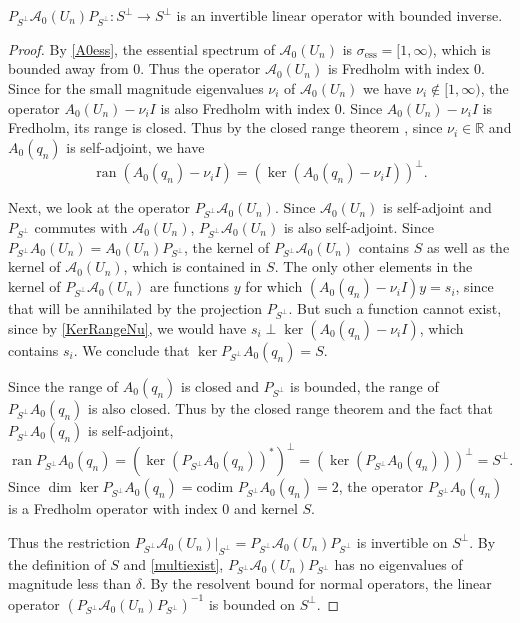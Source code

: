 \documentclass[review,onefignum,onetabnum]{siamart171218}
\newcommand{\R}{\mathbb{R}}
\def\dim{\mathop\mathrm{dim}\nolimits}
\def\ker{\mathop\mathrm{ker}\nolimits}
\def\Ran{\mathop\mathrm{ran}\nolimits}
\newcommand{\calA}{\mathcal{A}}
\begin{document}

\begin{lemma}\label{PA0inv}
$P_{S^\perp} \calA_0(U_n) P_{S^\perp}: S^\perp \rightarrow S^\perp$ is an invertible linear operator with bounded inverse.
\end{lemma}

\begin{proof}
By \cref{A0ess}, the essential spectrum of $\calA_0(U_n)$ is $\sigma_{\text{ess}} = [1, \infty)$, which is bounded away from 0.
Thus the operator $\calA_0(U_n)$ is Fredholm with index 0. Since for the small magnitude eigenvalues $\nu_i$ of $\calA_0(U_n)$ we have $\nu_i \notin [1, \infty)$, the operator $A_0(U_n)  - \nu_i I$ is also Fredholm with index 0. Since $A_0(U_n)  - \nu_i I$ is Fredholm, its range is closed. Thus by the closed range theorem \cite[p.~205]{Yosida}, since $\nu_i \in \R$ and $A_0(q_n)$ is self-adjoint, we have
\begin{equation}\label{KerRangeNu}
\Ran (A_0(q_n) - \nu_i I) = \left(\ker (A_0(q_n) - \nu_i I)\right)^\perp.
\end{equation}

Next, we look at the operator $P_{S^\perp} \calA_0(U_n)$. Since $\calA_0(U_n)$ is self-adjoint and $P_{S^\perp}$ commutes with $\calA_0(U_n)$, $P_{S^\perp} \calA_0(U_n)$ is also self-adjoint. Since $P_{S^\perp} A_0(U_n) = A_0(U_n) P_{S^\perp}$, the kernel of $P_{S^\perp} \calA_0(U_n)$ contains $S$ as well as the kernel of $\calA_0(U_n)$, which is contained in $S$. The only other elements in the kernel of $P_{S^\perp} \calA_0(U_n)$ are functions $y$ for which $(A_0(q_n) - \nu_i I) y = s_i$, since that will be annihilated by the projection $P_{S^\perp}$. But such a function cannot exist, since by \eqref{KerRangeNu}, we would have $s_i \perp \ker (A_0(q_n) - \nu_i I)$, which contains $s_i$. We conclude that $\ker P_{S^\perp} A_0(q_n) = S$.

Since the range of $A_0(q_n)$ is closed and $P_{S^\perp}$ is bounded, the range of $P_{S^\perp} A_0(q_n)$ is also closed. Thus by the closed range theorem and the fact that $P_{S^\perp} A_0(q_n)$ is self-adjoint,
\[
\Ran P_{S^\perp} A_0(q_n) = (\ker (P_{S^\perp} A_0(q_n))^*)^\perp = (\ker (P_{S^\perp} A_0(q_n)))^\perp = S^\perp.
\]
Since $\dim \ker P_{S^\perp} A_0(q_n) = \text{codim } P_{S^\perp} A_0(q_n) = 2$, the operator $P_{S^\perp} A_0(q_n)$ is a Fredholm operator with index 0 and kernel $S$.

Thus the restriction $P_{S^\perp} \calA_0(U_n)|_{S^\perp} = P_{S^\perp} \calA_0(U_n) P_{S^\perp}$ is invertible on $S^\perp$. By the definition of $S$ and \cref{multiexist}, $P_{S^\perp}\calA_0(U_n)P_{S^\perp}$ has no eigenvalues of magnitude less than $\delta$. By the resolvent bound for normal operators, the linear operator $(P_{S^\perp} \calA_0(U_n)P_{S^\perp})^{-1}$ is bounded on $S^\perp$.
\end{proof}
\end{document}

